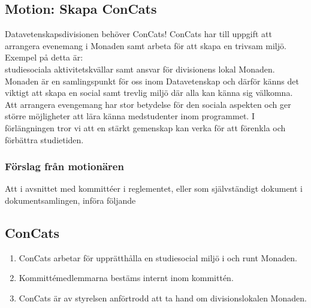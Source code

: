 \documentclass[protokoll]{dvd}
\begin{document}
\newpage

\subsection{Motion: Skapa ConCats}

Datavetenskapsdivisionen behöver ConCats! ConCats har till uppgift att arrangera
evenemang i Monaden samt arbeta för att skapa en trivsam miljö. Exempel på detta är: \\
studiesociala aktivitetskvällar samt ansvar för divisionens lokal Monaden. \\
Monaden är en samlingspunkt för oss inom Datavetenskap och därför känns det viktigt att
skapa en social samt trevlig miljö där alla kan känna sig välkomna. Att arrangera
evengemang har stor betydelse för den sociala aspekten och ger större möjligheter att lära
känna medstudenter inom programmet. I förlängningen tror vi att en stärkt gemenskap kan
verka för att förenkla och förbättra studietiden.

    \subsubsection*{Förslag från motionären}

        \begin{attsatser}
        \item Att i avsnittet med kommittéer i reglementet, eller som självständigt dokument i dokumentsamlingen, införa följande

        \begin{displayquote}
            \subsection*{ConCats}
            \begin{enumerate}[label=\arabic* §]
                \item ConCats arbetar för upprätthålla en studiesocial miljö i och runt Monaden.

                \item Kommittémedlemmarna bestäms internt inom kommittén.

                \item ConCats är av styrelsen anförtrodd att ta hand om divisionslokalen Monaden.
            \end{enumerate}
        \end{displayquote}
    \end{attsatser}
\end{document}

